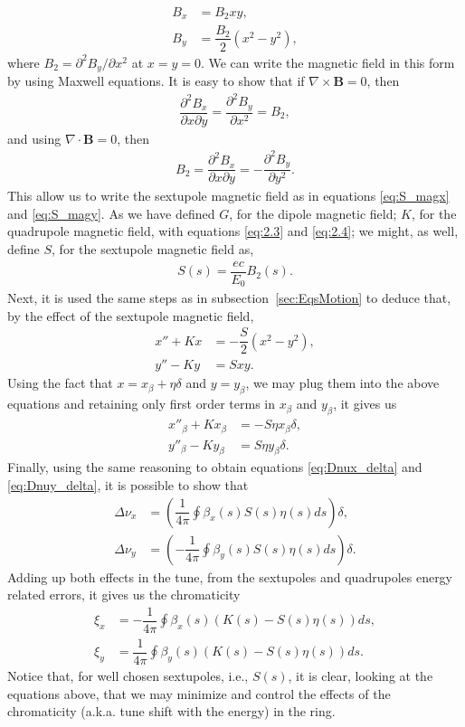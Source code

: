 \begin{align}
	B_x &= B_2 x y, \label{eq:S_magx} \\ 
    B_y &= \dfrac{B_2}{2} (x^2 - y^2),\label{eq:S_magy}
\end{align}
where $B_2 = \partial^2 B_y/\partial x^2$ at $x=y=0$. We can write the magnetic field in this form by using Maxwell equations. It is easy to show that if $\nabla \times \bm{B} = 0$, then
\begin{align*}
	\dfrac{\partial^2 B_x}{\partial x \partial y} = \dfrac{\partial^2 B_y}{\partial x^2} = B_2, 
\end{align*}
and using $\nabla \cdot \bm{B} = 0$, then
\begin{align*}
	B_2 = \dfrac{\partial^2 B_x}{\partial x \partial y} = - \dfrac{\partial^2 B_y}{\partial y^2}.
\end{align*}
This allow us to write the sextupole magnetic field as in equations \eqref{eq:S_magx} and \eqref{eq:S_magy}.
As we have defined $G$, for the dipole magnetic field; $K$, for the quadrupole magnetic field, with equations \eqref{eq:2.3} and \eqref{eq:2.4}; we might, as well, define $S$, for the sextupole magnetic field as,
\begin{align}
	S(s) = \dfrac{ec}{E_0} B_2(s).
\end{align}
Next, it is used the same steps as in subsection~\ref{sec:EqsMotion} to deduce that, by the effect of the sextupole magnetic field,
\begin{align}
	x''+ K x &= - \dfrac{S}{2} (x^2 - y^2),\\
    y''- K y &= S x y.
\end{align}
Using the fact that $x = x_{\beta} + \eta \delta$ and $y = y_{\beta}$, we may plug them into the above equations and retaining only first order terms in $x_{\beta}$ and $y_{\beta}$, it gives us
\begin{align}
	x''_{\beta} + K x_{\beta} &= - S \eta x_{\beta} \delta, \\
    y''_{\beta} - K y_{\beta} &= S \eta y_{\beta} \delta.
\end{align}
Finally, using the same reasoning to obtain equations \eqref{eq:Dnux_delta} and \eqref{eq:Dnuy_delta}, it is possible to show that
\begin{align}
	\Delta\nu_x &= \left( \dfrac{1}{4\pi}\oint\beta_x(s) S(s)\eta(s) ds \right) \delta,\\
    \Delta\nu_y &= \left( -\dfrac{1}{4\pi}\oint\beta_y(s) S(s)\eta(s) ds \right) \delta.
\end{align}
Adding up both effects in the tune, from the sextupoles and quadrupoles energy related errors, it gives us the chromaticity
\begin{align}
	\xi_x &= -\dfrac{1}{4\pi}\oint\beta_x(s)(K(s) - S(s)\eta(s)) ds, \\
    \xi_y &= \dfrac{1}{4\pi}\oint\beta_y(s)(K(s) - S(s)\eta(s)) ds.
\end{align}
Notice that, for well chosen sextupoles, i.e., $S(s)$, it is clear, looking at the equations above, that we may minimize and control the effects of the chromaticity (a.k.a. tune shift with the energy) in the ring.
